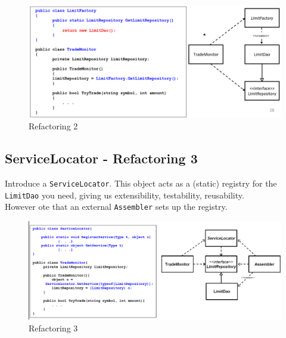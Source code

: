 \begin{figure}[htbp]
   \centering
   \includegraphics{images/trademonitor_ref2.png}
   \caption{Refactoring 2}
   \label{fig:trademonitor_ref2}
\end{figure}

\subsection{ServiceLocator - Refactoring 3}
Introduce a \texttt{ServiceLocator}. This object acts as a (static)
registry for the \texttt{LimitDao} you need,
giving us extensibility, testability, reusability.\\
However ote that an external \texttt{Assembler} sets up the registry.

\begin{figure}[htbp]
   \centering
   \includegraphics[width=0.7\columnwidth]{images/trademonitor_ref3.png}
   \caption{Refactoring 3}
   \label{fig:trademonitor_ref3}
\end{figure}


